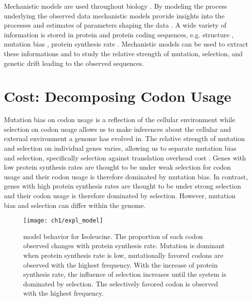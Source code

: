 Mechanistic models are used throughout biology \citep{GoldmanAndYang1994,loreau1998,DavisAndPelsor2001,adf2007,McGill2007}.
By modeling the process underlying the observed data mechanistic models provide insights into the processes and estimates of parameters shaping the data \citep{Liberles2013}.
A wide variety of information is stored in protein and protein coding sequences, e.g. structure \citep{anfinsen1973}, mutation bias \citep{ShahAndGilchrist2011, gilchrist2015}, protein synthesis rate \citep{gilchrist2007,gilchrist2015}. 
Mechanistic models can be used to extract these informations and to study the relative strength of mutation, selection, and genetic drift leading to the observed sequences.

\section{Cost: Decomposing Codon Usage}

Mutation bias on codon usage is a reflection of the cellular environment while selection on codon usage allows us to make inferences about the cellular and external environment a genome has evolved in.
The relative strength of mutation and selection on individual genes varies, allowing us to separate mutation bias and selection, specifically selection against translation overhead cost \citep{gilchrist2007,ShahAndGilchrist2011,gilchrist2015}.
Genes with low protein synthesis rates are thought to be under weak selection for codon usage and their codon usage is therefore dominated by mutation bias.
In contrast, genes with high protein synthesis rates are thought to be under strong selection and their codon usage is therefore dominated by selection.
However, mutation bias and selection can differ within the genome.

\singlespacing
\begin{figure}
     \centering
	\texttt{[image: ch1/expl\_model]}
	\caption{\ROC model behavior for Isoleucine.
	The proportion of each codon observed changes with protein synthesis rate.
	Mutation is dominant when protein synthesis rate is low, mutationally favored codons are observed with the highest frequency.
	With the increase of protein synthesis rate, the influence of selection increases until the system is dominated by selection.
	The selectively favored codon is observed with the highest frequency.}
	\label{fig:expl_model}
\end{figure}
\doublespacing

